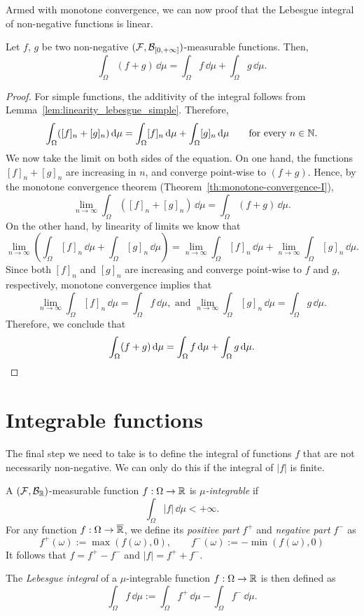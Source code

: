 Armed with monotone convergence, we can now proof that the Lebesgue integral of non-negative functions is linear.

\begin{lemma}
	\label{pr:additivity-integral-nonneg}
	Let $f$, $g$ be two non-negative $(\mathcal F,\mathcal B_{[0,+\infty]})$-measurable functions. Then,
	\[
		\int_\Omega (f + g)\, \dd \mu = \int_\Omega f\, \dd \mu + \int_\Omega g\, \dd \mu.
	\]	
\end{lemma}
\begin{proof}
	For simple functions, the additivity of the integral follows from Lemma~\ref{lem:linearity_lebesgue_simple}. Therefore, 
	\[
	\int_\Omega ([f]_n + [g]_n)\, \mathrm{d} \mu = \int_\Omega [f]_n\, \mathrm{d} \mu + \int_\Omega [g]_n\, \mathrm{d} \mu\qquad\text{for every $n \in \mathbb N$.}
	\]
	We now take the limit on both sides of the equation. On one hand, the functions $[f]_n + [g]_n$ are increasing in $n$, and converge point-wise to $(f + g)$. Hence, by the monotone convergence theorem (Theorem~\ref{th:monotone-convergence-I}),
	\[
	\lim_{n \to \infty} \int_\Omega ([f]_n + [g]_n)\, \dd \mu = 
	\int_\Omega ( f + g)\, \dd \mu.
	\]
	On the other hand, by linearity of limits we know that 
	\[
	\lim_{n \to \infty} \left( \int_\Omega [f]_n\, \dd \mu + \int_\Omega [g]_n\, \dd \mu \right) 
		= \lim_{n \to \infty} \int_\Omega [f]_n\, \dd \mu + \lim_{n \to \infty} \int_\Omega [g]_n\, \dd \mu.
	\]
	Since both $[f]_n$ and $[g]_n$ are increasing and converge point-wise to $f$ and $g$, respectively, monotone convergence implies that
	\[
		\lim_{n \to \infty} \int_\Omega [f]_n\, \dd \mu = \int_\Omega f\, \dd \mu, \text{ and }
		\lim_{n \to \infty} \int_\Omega [g]_n\, \dd \mu = \int_\Omega g\, \dd \mu.
	\]
	Therefore, we conclude that
	\[
	\int_\Omega (f + g)\, \mathrm{d} \mu = \int_\Omega f\, \mathrm{d} \mu + \int_\Omega g\, \mathrm{d} \mu.\qedhere
	\]
\end{proof}


\section{Integrable functions}\label{sec:integrable}

The final step we need to take is to define the integral of functions $f$ that are not necessarily non-negative. We can only do this if the integral of $|f|$ is finite.

\begin{definition}\label{def:lebesgue_integral_general}
	A $(\mathcal F,\mathcal B_{\mathbb R})$-measurable function $f: \Omega \to \mathbb R$ is \emph{$\mu$-integrable} if 
	\[
	\int_\Omega |f|\, \dd \mu < +\infty.	
	\]
	For any function $f: \Omega \to \overline{\mathbb R}$, we define its \emph{positive part} $f^+$ and \emph{negative part} $f^-$ as
\[
	f^+(\omega) := \max( f(\omega), 0 ),\qquad 
	f^-(\omega) := - \min( f(\omega), 0 ) 
\]
It follows that $f = f^+ - f^-$ and $|f| = f^+ + f^-$.

	The \emph{Lebesgue integral} of a $\mu$-integrable function $f: \Omega \to \mathbb R$ is then defined as
	\[
		\int_\Omega f\,\dd \mu := \int_\Omega f^+\, \dd \mu - \int_\Omega f^-\, \dd \mu.
	\]
\end{definition}

